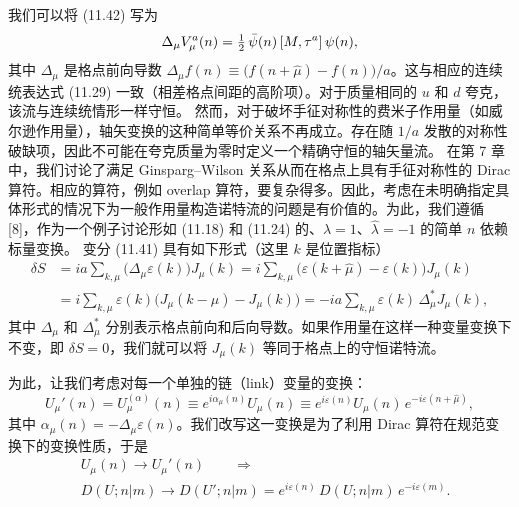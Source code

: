 我们可以将 (11.42) 写为
\begin{equation}
\Delta_\mu V_\mu^a(n) = \tfrac{1}{2}\,\bar{\psi}(n)\,[M, \tau^a]\,\psi(n) ,
\end{equation}
其中 $\Delta_\mu$ 是格点前向导数 $\Delta_\mu f(n) \equiv \bigl(f(n + \hat{\mu}) - f(n)\bigr)/a$。这与相应的连续统表达式 (11.29) 一致（相差格点间距的高阶项）。对于质量相同的 $u$ 和 $d$ 夸克，该流与连续统情形一样守恒。
然而，对于破坏手征对称性的费米子作用量（如威尔逊作用量），轴矢变换的这种简单等价关系不再成立。存在随 $1/a$ 发散的对称性破缺项，因此不可能在夸克质量为零时定义一个精确守恒的轴矢量流。
在第 7 章中，我们讨论了满足 Ginsparg–Wilson 关系从而在格点上具有手征对称性的 Dirac 算符。相应的算符，例如 overlap 算符，要复杂得多。因此，考虑在未明确指定具体形式的情况下为一般作用量构造诺特流的问题是有价值的。为此，我们遵循 [8]，作为一个例子讨论形如 (11.18) 和 (11.24) 的、$\lambda = 1$、$\hat{\lambda} = -1$ 的简单 $n$ 依赖标量变换。
变分 (11.41) 具有如下形式（这里 $k$ 是位置指标）
\begin{equation}
\begin{aligned}
\delta S &= i a \sum_{k,\mu} \bigl(\Delta_\mu\varepsilon(k)\bigr) J_\mu(k)
= i \sum_{k,\mu} \bigl(\varepsilon(k + \hat{\mu}) - \varepsilon(k)\bigr) J_\mu(k) \\
&= i \sum_{k,\mu} \varepsilon(k) \bigl(J_\mu(k - \hat{\mu}) - J_\mu(k)\bigr)
= -i a \sum_{k,\mu} \varepsilon(k)\, \Delta_\mu^* J_\mu(k) ,
\end{aligned}
\end{equation}
其中 $\Delta_\mu$ 和 $\Delta_\mu^*$ 分别表示格点前向和后向导数。如果作用量在这样一种变量变换下不变，即 $\delta S = 0$，我们就可以将 $J_\mu(k)$ 等同于格点上的守恒诺特流。

为此，让我们考虑对每一个单独的链（link）变量的变换：
\begin{equation}
U_\mu'(n) = U_\mu^{(\alpha)}(n) \equiv e^{i\alpha_\mu(n)} U_\mu(n)
\equiv e^{i\varepsilon(n)} U_\mu(n)\, e^{-i\varepsilon(n + \hat{\mu})} ,
\end{equation}
其中 $\alpha_\mu(n) = -\Delta_\mu\varepsilon(n)$。我们改写这一变换是为了利用 Dirac 算符在规范变换下的变换性质，于是
\begin{equation}
\begin{aligned}
&U_\mu(n) \to U_\mu'(n) \qquad\Rightarrow\qquad\\
&D(U; n|m) \to D(U'; n|m) = e^{i\varepsilon(n)}\, D(U; n|m)\, e^{-i\varepsilon(m)} .
\end{aligned}
\end{equation}


